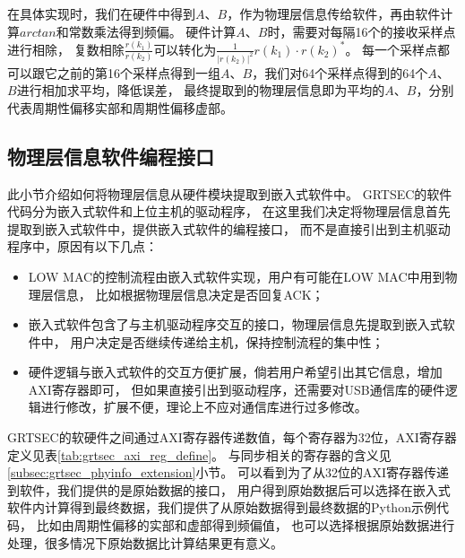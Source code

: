 		在具体实现时，我们在硬件中得到$A$、$B$，作为物理层信息传给软件，再由软件计算$arctan$和常数乘法得到频偏。
		硬件计算$A$、$B$时，需要对每隔16个的接收采样点进行相除，
		复数相除$\frac{r(k_1)}{r(k_2)}$可以转化为$\frac{1}{|r(k_2)|^2}r(k_1) \cdot r(k_2)^* $。
		每一个采样点都可以跟它之前的第16个采样点得到一组$A$、$B$，我们对64个采样点得到的64个$A$、$B$进行相加求平均，降低误差，
		最终提取到的物理层信息即为平均的$A$、$B$，分别代表周期性偏移实部和周期性偏移虚部。

		\subsection{物理层信息软件编程接口}\label{subsec:grtsec_phyinfo_api}
		此小节介绍如何将物理层信息从硬件模块提取到嵌入式软件中。
		GRTSEC的软件代码分为嵌入式软件和上位主机的驱动程序，
		在这里我们决定将物理层信息首先提取到嵌入式软件中，提供嵌入式软件的编程接口，
		而不是直接引出到主机驱动程序中，原因有以下几点：
			\begin{itemize}
				\item LOW MAC的控制流程由嵌入式软件实现，用户有可能在LOW MAC中用到物理层信息，
				比如根据物理层信息决定是否回复ACK；
				\item 嵌入式软件包含了与主机驱动程序交互的接口，物理层信息先提取到嵌入式软件中，
				用户决定是否继续传递给主机，保持控制流程的集中性；
				\item 硬件逻辑与嵌入式软件的交互方便扩展，倘若用户希望引出其它信息，增加AXI寄存器即可，
				但如果直接引出到驱动程序，还需要对USB通信库的硬件逻辑进行修改，扩展不便，理论上不应对通信库进行过多修改。
			\end{itemize}

		GRTSEC的软硬件之间通过AXI寄存器传递数值，每个寄存器为32位，AXI寄存器定义见表\ref{tab:grtsec_axi_reg_define}。
		与同步相关的寄存器的含义见\ref{subsec:grtsec_phyinfo_extension}小节。
		可以看到为了从32位的AXI寄存器传递到软件，我们提供的是原始数据的接口，
		用户得到原始数据后可以选择在嵌入式软件内计算得到最终数据，我们提供了从原始数据得到最终数据的Python示例代码，
		比如由周期性偏移的实部和虚部得到频偏值，
		也可以选择根据原始数据进行处理，很多情况下原始数据比计算结果更有意义。


